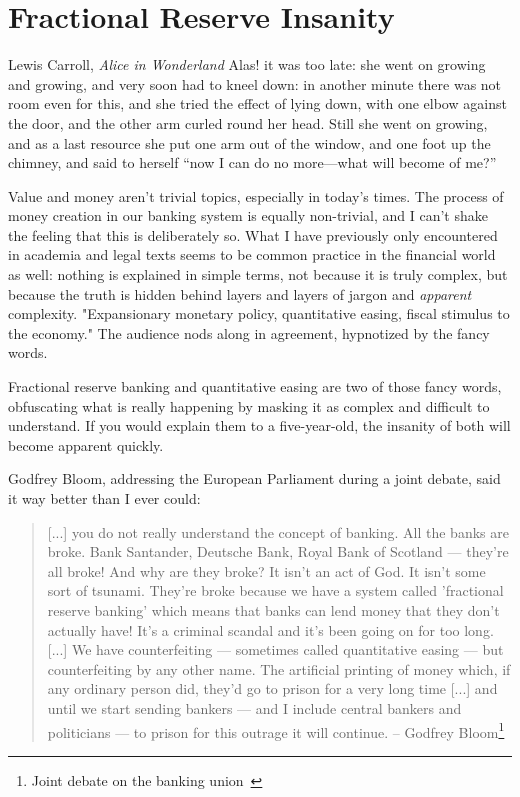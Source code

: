 \chapter{Fractional Reserve Insanity}
\label{les:13}

\begin{chapquote}{Lewis Carroll, \textit{Alice in Wonderland}}
Alas! it was too late: she went on growing and growing, and very soon had to
kneel down: in another minute there was not room even for this, and she tried
the effect of lying down, with one elbow against the door, and the other arm
curled round her head. Still she went on growing, and as a last resource she put
one arm out of the window, and one foot up the chimney, and said to herself
``now I can do no more—what will become of me?''
\end{chapquote}

Value and money aren't trivial topics, especially in today's times. The
process of money creation in our banking system is equally non-trivial,
and I can't shake the feeling that this is deliberately so. What I have
previously only encountered in academia and legal texts seems to be
common practice in the financial world as well: nothing is explained in
simple terms, not because it is truly complex, but because the truth is
hidden behind layers and layers of jargon and \textit{apparent} complexity.
"Expansionary monetary policy, quantitative easing, fiscal stimulus to
the economy." The audience nods along in agreement, hypnotized by the
fancy words.

Fractional reserve banking and quantitative easing are two of those
fancy words, obfuscating what is really happening by masking it as
complex and difficult to understand. If you would explain them to a
five-year-old, the insanity of both will become apparent quickly.

Godfrey Bloom, addressing the European Parliament during a joint
debate, said it way better than I ever could:

\begin{quotation}
[...] you do not really understand the concept of banking. All the
banks are broke. Bank Santander, Deutsche Bank, Royal Bank of
Scotland --- they're all broke! And why are they broke? It isn't an
act of God. It isn't some sort of tsunami. They're broke because we
have a system called 'fractional reserve banking' which means that
banks can lend money that they don't actually have! It's a criminal
scandal and it's been going on for too long. [...]
We have counterfeiting --- sometimes called quantitative
easing --- but counterfeiting by any other name. The artificial
printing of money which, if any ordinary person did, they'd go to
prison for a very long time [...] and until we start sending
bankers --- and I include central bankers and politicians --- to
prison for this outrage it will continue.
\flushright -- Godfrey Bloom\footnote{Joint debate on the
banking union~\cite{godfrey-bloom}}
\end{quotation}


